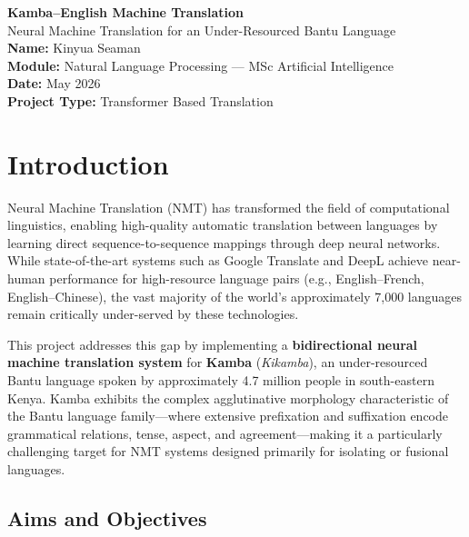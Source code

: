 \documentclass[12pt,a4paper]{article}
\begin{document}
\begin{titlepage}
\centering
\vspace*{3cm}
{\Huge\bfseries Kamba--English Machine Translation\\[0.4cm]}
{\Large Neural Machine Translation for an Under-Resourced Bantu Language}\\[2cm]
{\large\textbf{Name:} Kinyua Seaman}\\[0.3cm]
{\large\textbf{Module:} Natural Language Processing --- MSc Artificial Intelligence}\\[0.5cm]
{\large\textbf{Date:} May 2026}\\[0.5cm]
{\large\textbf{Project Type:} Transformer Based Translation}\\[3cm]
\vfill
\end{titlepage}

\tableofcontents
\newpage

\section{Introduction}

Neural Machine Translation (NMT) has transformed the field of computational linguistics, enabling high-quality automatic translation between languages by learning direct sequence-to-sequence mappings through deep neural networks. While state-of-the-art systems such as Google Translate and DeepL achieve near-human performance for high-resource language pairs (e.g., English--French, English--Chinese), the vast majority of the world's approximately 7,000 languages remain critically under-served by these technologies.

This project addresses this gap by implementing a \textbf{bidirectional neural machine translation system} for \textbf{Kamba} (\emph{Kikamba}), an under-resourced Bantu language spoken by approximately 4.7 million people in south-eastern Kenya. Kamba exhibits the complex agglutinative morphology characteristic of the Bantu language family---where extensive prefixation and suffixation encode grammatical relations, tense, aspect, and agreement---making it a particularly challenging target for NMT systems designed primarily for isolating or fusional languages.

\subsection{Aims and Objectives}
\end{document}
